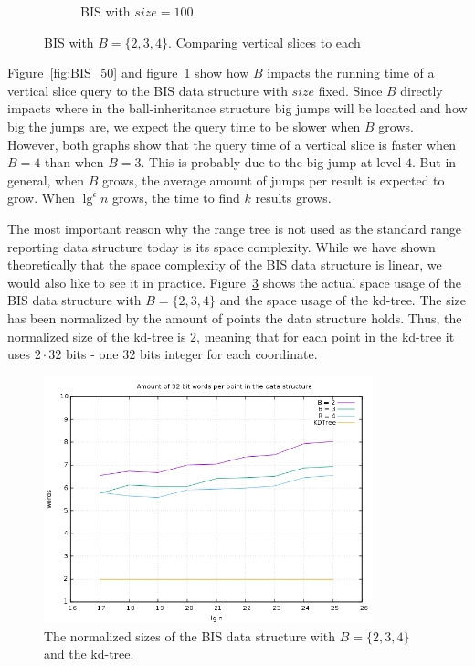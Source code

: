 \begin{figure}[h]
{\begin{subfigure}[b]{0.68\textwidth}
        \caption{BIS with $size = 100$.}
        \label{fig:BIS_100}
    \end{subfigure}
  }
  \caption{BIS with $B = \{2,3,4\}$. Comparing vertical slices to each}
  \label{fig:comparing_BIS}
  
\end{figure}

Figure~\ref{fig:BIS_50} and figure~\ref{fig:BIS_100} show how $B$ impacts the running time of a vertical slice query to the BIS data structure with $size$ fixed. Since $B$ directly impacts where in the ball-inheritance structure big jumps will be located and how big the jumps are, we expect the query time to be slower when $B$ grows. However, both graphs show that the query time of a vertical slice is faster when $B = 4$ than when $B = 3$. This is probably due to the big jump at level $4$. But in general, when $B$ grows, the average amount of jumps per result is expected to grow. When $\lg^\epsilon n$ grows, the time to find $k$ results grows.

The most important reason why the range tree is not used as the standard range reporting data structure today is its space complexity. While we have shown theoretically that the space complexity of the BIS data structure is linear, we would also like to see it in practice. Figure~\ref{fig:sizes} shows the actual space usage of the BIS data structure with $B=\{2,3,4\}$ and the space usage of the kd-tree. The size has been normalized by the amount of points the data structure holds. Thus, the normalized size of the kd-tree is $2$, meaning that for each point in the kd-tree it uses $2\cdot 32$ bits - one $32$ bits integer for each coordinate.

\begin{figure}[h]
    \centering
    \includegraphics[width = 0.85\textwidth]{pictures/analysis/sizes.png}
    \caption{The normalized sizes of the BIS data structure with $B=\{2,3,4\}$ and the kd-tree.}\label{fig:sizes}
\end{figure}
\clearpage


